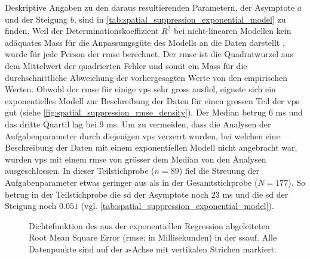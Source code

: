 \documentclass[11pt, twoside, a4paper]{book}		%
\begin{document}
Deskriptive Angaben zu den daraus resultierenden Parametern, der Asymptote $a$ und der Steigung $b$, sind in \autoref{tab:spatial_suppression_exponential_model} zu finden.
Weil der Determinationskoeffizient $R^2$ bei nicht-linearen Modellen kein adäquates Mass für die Anpassungsgüte des Modells an die Daten darstellt \citep{Spiess2010}, wurde für jede Person der \gls{rmse} berechnet. Der \gls{rmse} ist die Quadratwurzel aus dem Mittelwert der quadrierten Fehler und somit ein Mass für die durchschnittliche Abweichung der vorhergesagten Werte von den empirischen Werten. 
Obwohl der \gls{rmse} für einige \glspl{vp} sehr gross ausfiel, eignete sich ein exponentielles Modell zur Beschreibung der Daten für einen grossen Teil der \glspl{vp} gut (siehe \autoref{fig:spatial_suppression_rmse_density}). Der Median betrug $6$ ms und das dritte Quartil lag bei $9$ ms.
Um zu vermeiden, dass die Analysen der Aufgabenparameter durch diejenigen \glspl{vp} verzerrt wurden, bei welchen eine Beschreibung der Daten mit einem exponentiellen Modell nicht angebracht war, wurden \glspl{vp} mit einem \gls{rmse} von grösser dem Median von den Analysen ausgeschlossen. 
In dieser Teilstichprobe ($n=89$) fiel die Streuung der Aufgabenparameter etwas geringer aus als in der Gesamtstichprobe ($N=177$). So betrug in der Teilstichprobe die \gls{sd} der Asymptote noch $23$ ms und die \gls{sd} der Steigung noch $0.051$ (vgl. \autoref{tab:spatial_suppression_exponential_model}).



\begin{figure}[t]
	\centering
	\begin{adjustbox}{width=1\textwidth}
		
	\end{adjustbox}
	\caption[Dichtefunktion des RMSE]{Dichtefunktion des aus der exponentiellen Regression abgeleiteten Root Mean Square Error (\gls{rmse}; in Millisekunden) in der \gls{ssauf}.  Alle Datenpunkte sind auf der \textit{x}-Achse mit vertikalen Strichen markiert.}
	\label{fig:spatial_suppression_rmse_density}
\end{figure}
\end{document}
